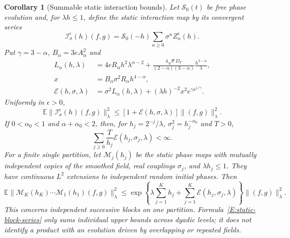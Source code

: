 \documentclass[12pt]{article}
\numberwithin{equation}{section}
\newtheorem{corollary}[theorem]{Corollary}
\theoremstyle{definition}
\newcommand{\E}{\mathbb{E}}
\begin{document}
\begin{corollary}[Summable static interaction bounds]
  \label{C:static-interaction}
  Let $\mathcal S_0(t)$ be free phase evolution and, for $\lambda h\le1$,
  define the static interaction map by its convergent series
  \[
    \mathcal I^\epsilon_\sigma(h)(f,g)
    =\mathcal S_0(-h)\sum_{n\ge0}\sigma^n Z_n^\epsilon(h).
  \]
  Put $\gamma=3-\alpha$, $B_\alpha=3eA_\alpha^2$ and
  \[
    \begin{split}
      L_\alpha(h,\lambda)
      &=4eR_\alpha h^2\lambda^{\alpha-2}
      +\frac{4\sqrt eD_\Gamma}{(2-\alpha)(3-\alpha)}
      \frac{h^{3-\alpha}}{\lambda},\\
      x&=B_\alpha\sigma^2R_\alpha h^{4-\alpha},\\
      \mathcal E(h,\sigma,\lambda)
      &=\sigma^2L_\alpha(h,\lambda)
      +(\lambda h)^{-2}x^2e^{\gamma x^{1/\gamma}}.
    \end{split}
  \]
  Uniformly in $\epsilon>0$,
  \begin{equation}\label{E:static-interaction}
    \E\|\mathcal I^\epsilon_\sigma(h)(f,g)\|_\lambda^2
    \le[1+\mathcal E(h,\sigma,\lambda)]\|(f,g)\|_\lambda^2.
  \end{equation}
  If $0<\alpha_0<1$ and $\alpha+\alpha_0<2$, then, for
  $h_j=2^{-j}/\lambda$, $\sigma_j^2=h_j^{-\alpha_0}$ and $T>0$,
  \begin{equation}\label{E:static-block-series}
    \sum_{j\ge0}\frac{T}{h_j}\mathcal E(h_j,\sigma_j,\lambda)<\infty.
  \end{equation}
  For a finite single partition, let $\mathcal M_j(h_j)$ be the static
  phase maps with mutually independent copies of the smoothed field,
  real couplings $\sigma_j$, and $\lambda h_j\le1$. They have continuous
  $L^2$ extensions to independent random initial phases. Then
  \begin{equation}\label{E:independent-static-blocks}
    \E\|\mathcal M_K(h_K)\cdots\mathcal M_1(h_1)(f,g)\|_\lambda^2
    \le
    \exp\left\{\lambda\sum_{j=1}^K h_j+
    \sum_{j=1}^K\mathcal E(h_j,\sigma_j,\lambda)\right\}
    \|(f,g)\|_\lambda^2.
  \end{equation}
  This concerns independent successive blocks on one partition.
  Formula~\eqref{E:static-block-series} only sums individual upper
  bounds across dyadic levels; it does not identify a product with
  an evolution driven by overlapping or repeated fields.
\end{corollary}
\end{document}
